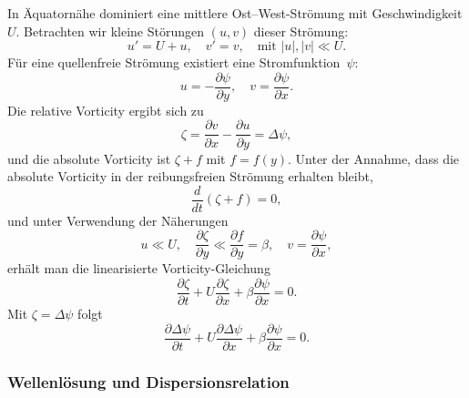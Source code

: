 In Äquatornähe dominiert eine mittlere Ost–West-Strömung mit Geschwindigkeit \(U\). Betrachten wir kleine Störungen \((u,v)\) dieser Strömung:
\begin{equation}
	u' = U + u, \quad v' = v, \quad \text{mit } |u|, |v| \ll U.
	\label{eq:perturbation}
\end{equation}
Für eine quellenfreie Strömung existiert eine Stromfunktion~\(\psi\):
\begin{equation}
	u = -\frac{\partial \psi}{\partial y}, \quad v = \frac{\partial \psi}{\partial x}.
	\label{eq:stream_function}
\end{equation}
Die relative Vorticity ergibt sich zu
\begin{equation}
	\zeta = \frac{\partial v}{\partial x} - \frac{\partial u}{\partial y} = \Delta \psi,
	\label{eq:relative_vorticity}
\end{equation}
und die absolute Vorticity ist \(\zeta + f\) mit \(f = f(y)\). Unter der Annahme, dass die absolute Vorticity in der reibungsfreien Strömung erhalten bleibt,
\begin{equation}
	\frac{d}{dt} (\zeta + f) = 0,
	\label{eq:absolute_vorticity_conservation}
\end{equation}
und unter Verwendung der Näherungen
\begin{equation}
	u \ll U, \quad \frac{\partial \zeta}{\partial y} \ll \frac{\partial f}{\partial y} = \beta, \quad v = \frac{\partial \psi}{\partial x},
	\label{eq:linear_approximations}
\end{equation}
erhält man die linearisierte Vorticity-Gleichung
\begin{equation}
	\frac{\partial \zeta}{\partial t} + U \frac{\partial \zeta}{\partial x} + \beta \frac{\partial \psi}{\partial x} = 0.
	\label{eq:linear_vorticity_equation}
\end{equation}
Mit \(\zeta = \Delta \psi\) folgt
\begin{equation}
	\frac{\partial \Delta \psi}{\partial t} + U \frac{\partial \Delta \psi}{\partial x} + \beta \frac{\partial \psi}{\partial x} = 0.
	\label{eq:linear_vorticity_equation_psi}
\end{equation}

\subsubsection{Wellenlösung und Dispersionsrelation}

